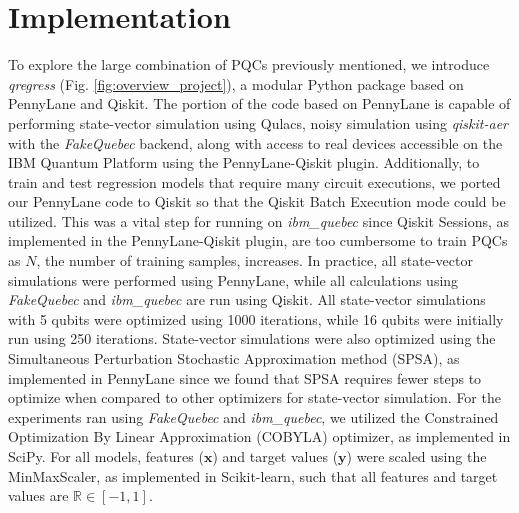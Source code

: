 \documentclass[journal=jacsat,manuscript=article]{achemso}
\begin{document}
\section{Implementation}
To explore the large combination of PQCs previously mentioned, we introduce \textit{qregress} (Fig. \ref{fig:overview_project}), a modular Python package based on PennyLane\cite{bergholm_pennylane_2022} and Qiskit\cite{javadi-abhari_quantum_2024}.
The portion of the code based on PennyLane is capable of performing state-vector simulation using Qulacs\cite{suzuki_qulacs_2021}, noisy simulation using \textit{qiskit-aer} with the \textit{FakeQuebec} backend, along with access to real devices accessible on the IBM Quantum Platform using the PennyLane-Qiskit plugin.
Additionally, to train and test regression models that require many circuit executions, we ported our PennyLane code to Qiskit so that the Qiskit Batch Execution mode could be utilized.
This was a vital step for running on \textit{ibm\_quebec} since Qiskit Sessions, as implemented in the PennyLane-Qiskit plugin, are too cumbersome to train PQCs as $N$, the number of training samples, increases.
In practice, all state-vector simulations were performed using PennyLane, while all calculations using \textit{FakeQuebec} and \textit{ibm\_quebec}  are run using Qiskit.
All state-vector simulations with 5 qubits were optimized using 1000 iterations, while 16 qubits were initially run using 250 iterations.
State-vector simulations were also optimized using the Simultaneous Perturbation Stochastic Approximation method (SPSA), as implemented in PennyLane since we found that SPSA requires fewer steps to optimize when compared to other optimizers for state-vector simulation. 
For the experiments ran using \textit{FakeQuebec} and  \textit{ibm\_quebec}, we utilized the Constrained Optimization By Linear Approximation (COBYLA) optimizer, as implemented in SciPy\cite{virtanen_scipy_2020}.
For all models, features ($\mathbf{x}$) and target values ($\mathbf{y}$) were scaled using the MinMaxScaler, as implemented in Scikit-learn\cite{pedregosa_scikit-learn_2011}, such that all features and target values are $\mathbb{R}\in [ -1,1 ]$.
\end{document}
